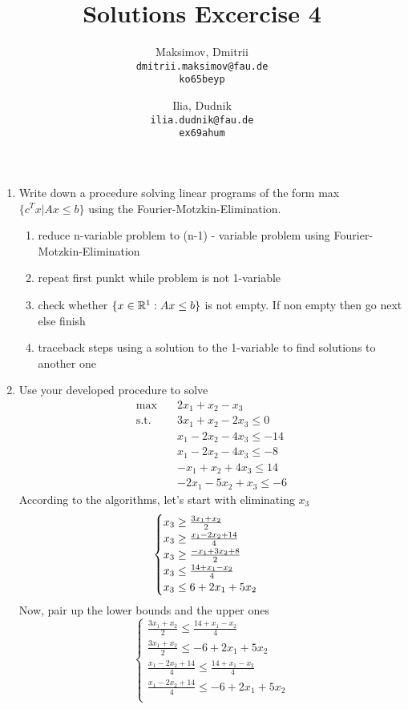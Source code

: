 \documentclass{homework}
\title{Solutions Excercise 4}
\author{
  Maksimov, Dmitrii\\
  \texttt{dmitrii.maksimov@fau.de} \\
  \texttt{ko65beyp}
  \and
  Ilia, Dudnik\\
  \texttt{ilia.dudnik@fau.de}\\
  \texttt{ex69ahum}
}
\begin{document}
\maketitle

\exercise
\begin{enumerate}[label=(\alph*)]
	\item Write down a procedure solving linear programs of the form max $\{c^Tx | Ax \leq b\}$ using the Fourier-Motzkin-Elimination.
	\begin{enumerate}[label=\arabic*.]
		\item reduce n-variable problem to (n-1) - variable problem using Fourier-Motzkin-Elimination
		\item repeat first punkt while problem is not 1-variable
		\item check whether $\{x\in\mathbb R^1: Ax\leq b\}$ is not empty. If non empty then go next else finish
		\item traceback steps using a solution to the 1-variable to find solutions to another one
	\end{enumerate}
	\item Use your developed procedure to solve
	\begin{align*}
	\text{max} \quad
	&2x_1 + x_2 - x_3 \\
	\text{s.t.} \quad
	&3x_1 + x_2 - 2x_3 \leq 0\\ 
	&x_1 - 2x_2 - 4x_3 \leq -14\\
	&x_1 - 2x_2 - 4x_3 \leq -8\\ 
	&-x_1 + x_2 + 4x_3 \leq 14\\
	&-2x_1 - 5x_2 + x_3 \leq -6
	\end{align*}
	According to the algorithms, let's start with eliminating $x_3$
	\[
	\begin{cases} 
	  x_3\geq\frac{3x_1+x_2}{2} \\
	  x_3\geq\frac{x_1-2x_2+14}{4} \\
	  x_3\geq\frac{-x_1+3x_2+8}{2} \\
	  x_3\leq\frac{14+x_1-x_2}{4} \\
	  x_3\leq\-6+2x_1+5x_2
	\end{cases}
	\]
	Now, pair up the lower bounds and the upper ones
	\[
	\begin{cases} 
	  \frac{3x_1+x_2}{2}\leq\frac{14+x_1-x_2}{4} \\
	  \frac{3x_1+x_2}{2}\leq-6+2x_1+5x_2 \\
	  \frac{x_1-2x_2+14}{4}\leq\frac{14+x_1-x_2}{4} \\
	  \frac{x_1-2x_2+14}{4}\leq-6+2x_1+5x_2 \\

\end{cases}\]
\end{enumerate}
\end{document}
